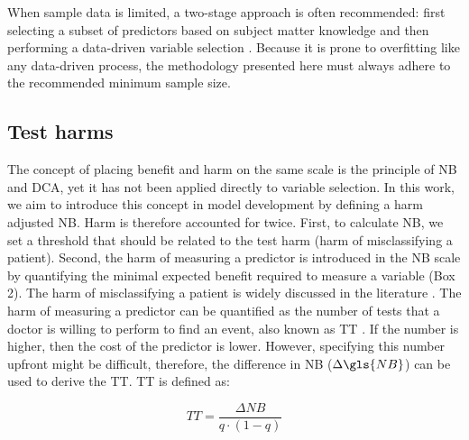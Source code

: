 When sample data is limited, a two-stage approach is often recommended: first selecting a subset of predictors based on subject matter knowledge and then performing a data-driven variable selection \cite{harrellRegressionModelingStrategies2015,steyerberg2019clinical}. Because it is prone to overfitting like any data-driven process, the methodology presented here must always adhere to the recommended minimum sample size.

\subsection{Test harms}

The concept of placing benefit and harm on the same scale is the principle of \gls{NB} and \gls{DCA}, yet it has not been applied directly to variable selection. In this work, we aim to introduce this concept in model development by defining a harm adjusted \gls{NB}. Harm is therefore accounted for twice. First, to calculate \gls{NB}, we set a threshold that should be related to the test harm (harm of misclassifying a patient). Second, the harm of measuring a predictor is introduced in the \gls{NB} scale by quantifying the minimal expected benefit required to measure a variable (Box 2). The harm of misclassifying a patient is widely discussed in the literature \cite{vickersSimpleStepbystepGuide2019,vickersDecisionCurveAnalysis2006}. The harm of measuring a predictor can be quantified as the number of tests that a doctor is willing to perform to find an event, also known as \gls{TT} \cite{vancalsterReportingInterpretingDecision2018}. If the number is higher, then the cost of the predictor is lower. However, specifying this number upfront might be difficult, therefore, the difference in \gls{NB} ($\Delta \gls{NB}$) can be used to derive the \gls{TT}. \gls{TT} is defined as:

\begin{equation}
TT = \frac{\Delta NB}{q \cdot (1-q)}
\end{equation}

